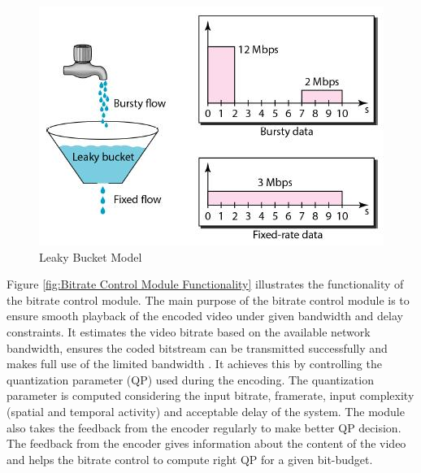 \documentclass[11pt]{article} %
\begin{document}
\begin{figure}[h]
    \centering
    \includegraphics[scale=0.5]{general/Leaky_bucket}
    \caption{Leaky Bucket Model}
    \label{fig-Leaky-Bucket-Model}
\end{figure} 	
	Figure \ref{fig:Bitrate Control Module Functionality} illustrates the functionality of the bitrate control module. The main purpose of the bitrate control module is to ensure smooth playback of the encoded video under given bandwidth and delay constraints. It estimates the video bitrate based on the available network bandwidth, ensures the coded bitstream can be transmitted successfully and makes full use of the limited bandwidth \cite{InTech-Rate-control-in-video-coding}. It achieves this by controlling the quantization parameter (QP) used during the encoding. The quantization parameter is computed considering the input bitrate, framerate, input complexity (spatial and temporal activity) and acceptable delay of the system. The module also takes the feedback from the encoder regularly to make better QP decision.  The feedback from the encoder gives information about the content of the video and helps the bitrate control to compute right QP for a given bit-budget.
	
\end{document}
